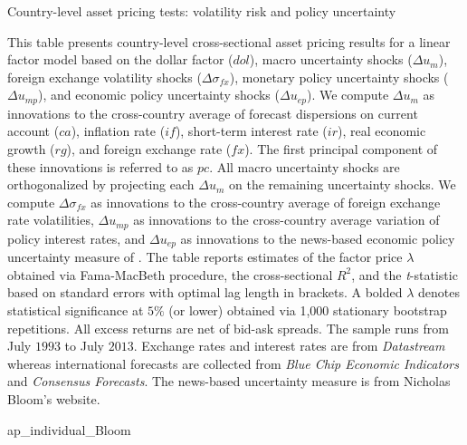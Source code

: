 \begin{landscape}
	
	\begin{table}[ht]
		\caption{Country-level asset pricing tests: volatility risk and policy uncertainty} \label{tab:ap_individual_Bloom}
		\begin{footnotesize}
			This table presents country-level cross-sectional asset pricing results for a linear factor model based on the dollar factor ($dol$), macro uncertainty shocks ($\Delta u_{m}$), foreign exchange volatility shocks ($\Delta\sigma_{fx}$), monetary policy uncertainty shocks ($\Delta u_{mp}$), and economic policy uncertainty shocks ($\Delta u_{ep}$). We compute $\Delta u_{m}$ as innovations to the cross-country average of forecast dispersions on current account ($ca$), inflation rate ($if$), short-term interest rate ($ir$), real economic growth ($rg$), and foreign exchange rate ($fx$). The first principal component of these innovations is referred to as $pc$. All macro uncertainty shocks are orthogonalized by projecting each $\Delta u_{m}$ on the remaining uncertainty shocks. We compute $\Delta \sigma_{fx}$ as innovations to the cross-country average of foreign exchange rate volatilities, $\Delta u_{mp}$ as innovations to the cross-country average variation of policy interest rates, and $\Delta u_{ep}$ as innovations to the news-based economic policy uncertainty measure of \citet{Baker/Bloom/Davis:2013}. The table reports estimates of the factor price $\lambda$ obtained via Fama-MacBeth procedure, the cross-sectional $R^{2}$, and the \emph{t}-statistic based on \citet{newey_west1987} standard errors with \citet{andrews1991} optimal lag length in brackets. A bolded $\lambda$ denotes statistical significance at $5\%$ (or lower) obtained via 1,000 stationary bootstrap repetitions. All excess returns are net of bid-ask spreads. The sample runs from July $1993$ to July $2013$. Exchange rates and interest rates are from \textit{Datastream} whereas international forecasts are collected from \textit{Blue Chip Economic Indicators} and \textit{Consensus Forecasts}.  The news-based uncertainty measure is from Nicholas Bloom's website.
		\end{footnotesize}
		
		{ap_individual_Bloom}
	\end{table}	
	
\end{landscape}



